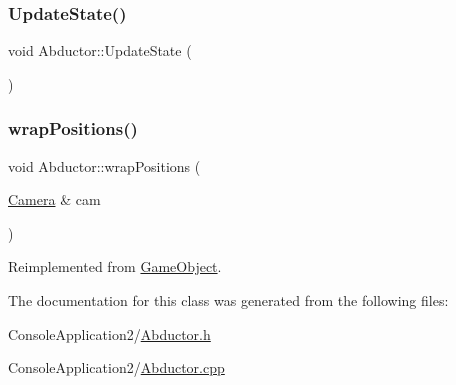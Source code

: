 \hypertarget{class_abductor_aee5fadabe89f51885e51a08d4a2d9889}{}\label{class_abductor_aee5fadabe89f51885e51a08d4a2d9889} 
\subsubsection{\texorpdfstring{Update\+State()}{UpdateState()}}
{\footnotesize\ttfamily void Abductor\+::\+Update\+State (\begin{DoxyParamCaption}{ }\end{DoxyParamCaption})}

\hypertarget{class_abductor_a4623b394ad899b8df96b52e997fa5b03}{}\label{class_abductor_a4623b394ad899b8df96b52e997fa5b03} 
\subsubsection{\texorpdfstring{wrap\+Positions()}{wrapPositions()}}
{\footnotesize\ttfamily void Abductor\+::wrap\+Positions (\begin{DoxyParamCaption}\item[{\hyperlink{class_camera}{Camera} \&}]{cam }\end{DoxyParamCaption})\hspace{0.3cm}{\ttfamily [virtual]}}



Reimplemented from \hyperlink{class_game_object_a53b129d55688652e25e6515d80e669ca}{Game\+Object}.



The documentation for this class was generated from the following files\+:\begin{DoxyCompactItemize}
\item 
Console\+Application2/\hyperlink{_abductor_8h}{Abductor.\+h}\item 
Console\+Application2/\hyperlink{_abductor_8cpp}{Abductor.\+cpp}\end{DoxyCompactItemize}
